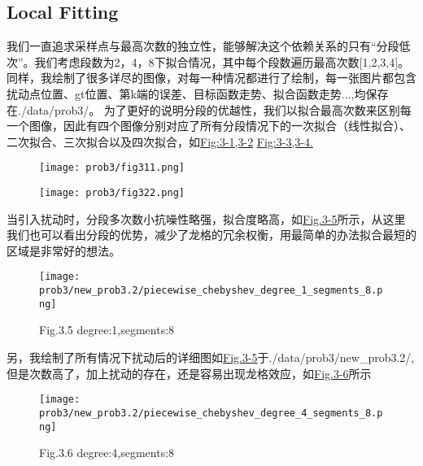 \documentclass{article}
\begin{document}
\subsection{Local Fitting}
我们一直追求采样点与最高次数的独立性，能够解决这个依赖关系的只有“分段低次”。我们考虑段数为2，4，8下拟合情况，其中每个段数遍历最高次数[1,2,3,4]。同样，我绘制了很多详尽的图像，对每一种情况都进行了绘制，每一张图片都包含扰动点位置、gt位置、第k端的误差、目标函数走势、拟合函数走势...,均保存在./data/prob3/。
为了更好的说明分段的优越性，我们以拟合最高次数来区别每一个图像，因此有四个图像分别对应了所有分段情况下的一次拟合（线性拟合）、二次拟合、三次拟合以及四次拟合，如\hyperref[fig:3-1,3-2]{Fig:3-1,3-2} \hyperref[fig:3-3,3-4]{Fig:3-3,3-4.}
\begin{figure}[H]
    \centering
    \texttt{[image: prob3/fig311.png]}
    \label{fig:3-1,3-2}
\end{figure}
\begin{figure}[H]
    \centering
    \texttt{[image: prob3/fig322.png]}
    \label{fig:3-3,3-4}
\end{figure}
\clearpage
当引入扰动时，分段多次数小抗噪性略强，拟合度略高，如\hyperref[fig:3-5]{Fig.3-5}所示，从这里我们也可以看出分段的优势，减少了龙格的冗余权衡，用最简单的办法拟合最短的区域是非常好的想法。
\begin{figure}[H]
    \centering
    \texttt{[image: prob3/new\_prob3.2/piecewise\_chebyshev\_degree\_1\_segments\_8.png]}
    \caption*{Fig.3.5 degree:1,segments:8}
    \label{fig:3-5}
\end{figure}
另，我绘制了所有情况下扰动后的详细图如\hyperref[fig:3-5]{Fig.3-5}于./data/prob3/new\_prob3.2/,但是次数高了，加上扰动的存在，还是容易出现龙格效应，如\hyperref[fig:3-6]{Fig.3-6}所示
\begin{figure}[H]
    \centering
    \texttt{[image: prob3/new\_prob3.2/piecewise\_chebyshev\_degree\_4\_segments\_8.png]}
    \caption*{Fig.3.6 degree:4,segments:8}
    \label{fig:3-6}
\end{figure}
\end{document}
